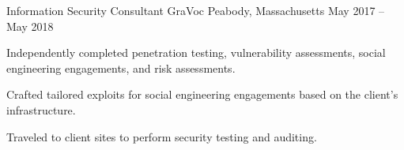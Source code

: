 \begin{cventries}
  \cventry
    {Information Security Consultant} %
    {GraVoc} %
    {Peabody, Massachusetts} %
    {May 2017 – May 2018} %
    {
      \begin{cvitems} %
        \item {
          Independently completed penetration testing, vulnerability assessments, social engineering engagements, and risk assessments.
        }
        \item {
          Crafted tailored exploits for social engineering engagements based on the client's infrastructure.
        }
        \item {
          Traveled to client sites to perform security testing and auditing.
        }
      \end{cvitems}
    }
\end{cventries}
